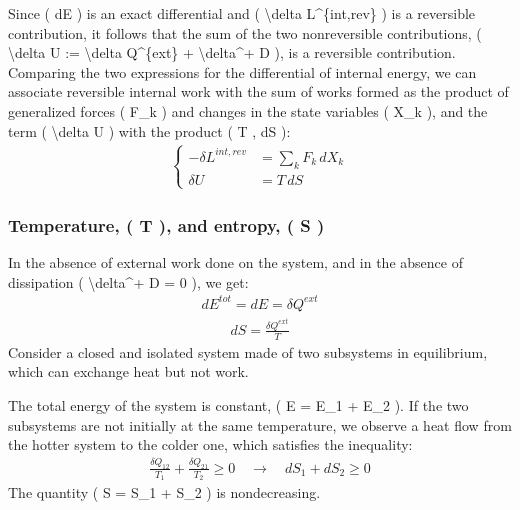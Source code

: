 \documentclass[letterpaper,10pt,english]{jupyterBook}
\begin{document}
\sphinxAtStartPar
Since ( dE ) is an exact differential and ( \textbackslash{}delta L\textasciicircum{}\{int,rev\} ) is a reversible contribution, it follows that the sum of the two non\sphinxhyphen{}reversible contributions, ( \textbackslash{}delta U := \textbackslash{}delta Q\textasciicircum{}\{ext\} + \textbackslash{}delta\textasciicircum{}+ D ), is a reversible contribution. Comparing the two expressions for the differential of internal energy, we can associate reversible internal work with the sum of works formed as the product of generalized forces ( F\_k ) and changes in the state variables ( X\_k ), and the term ( \textbackslash{}delta U ) with the product ( T , dS ):
\begin{equation*}
\begin{split}
\begin{cases}
  -\delta L^{int,rev} &= \sum_k F_k \, d X_k \\
  \delta U &= T \, dS
\end{cases}
\end{split}
\end{equation*}\subsubsection*{Temperature, ( T ), and entropy, ( S )}

\sphinxAtStartPar
In the absence of external work done on the system, and in the absence of dissipation ( \textbackslash{}delta\textasciicircum{}+ D = 0 ), we get:
\begin{equation*}
\begin{split}
dE^{tot} = dE = \delta Q^{ext}
\end{split}
\end{equation*}\begin{equation*}
\begin{split}
dS = \frac{\delta Q^{ext}}{T}
\end{split}
\end{equation*}
\sphinxAtStartPar
Consider a closed and isolated system made of two subsystems in equilibrium, which can exchange heat but not work.

\sphinxAtStartPar
The total energy of the system is constant, ( E = E\_1 + E\_2 ). If the two subsystems are not initially at the same temperature, we observe a heat flow from the hotter system to the colder one, which satisfies the inequality:
\begin{equation*}
\begin{split}
\frac{\delta Q_{12}}{T_1} + \frac{\delta Q_{21}}{T_2} \ge 0 \quad \rightarrow \quad dS_1 + dS_2 \ge 0
\end{split}
\end{equation*}
\sphinxAtStartPar
The quantity ( S = S\_1 + S\_2 ) is non\sphinxhyphen{}decreasing.
\end{document}
